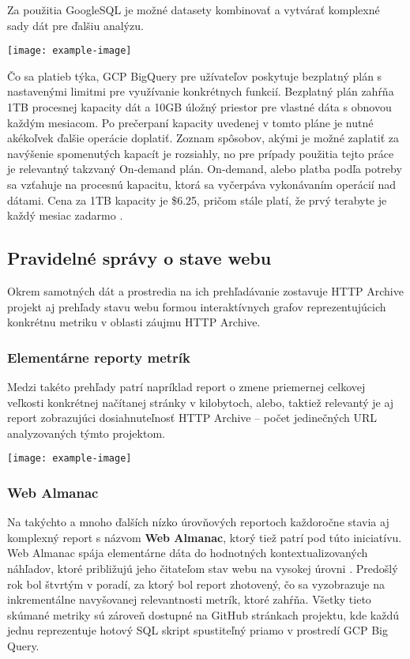 Za použitia GoogleSQL je možné datasety kombinovať a vytvárať komplexné sady dát pre ďalšiu analýzu.

\begin{center}
\noindent\texttt{[image: example-image]}    
\end{center}

Čo sa platieb týka, GCP BigQuery pre užívateľov poskytuje bezplatný plán s nastavenými limitmi pre využívanie konkrétnych funkcií.
Bezplatný plán zahŕňa 1TB procesnej kapacity dát a 10GB úložný priestor pre vlastné dáta s obnovou každým mesiacom.
Po prečerpaní kapacity uvedenej v tomto pláne je nutné akékoľvek ďalšie operácie doplatiť.
Zoznam spôsobov, akými je možné zaplatiť za navýšenie spomenutých kapacít je rozsiahly, no pre prípady použitia tejto práce je relevantný takzvaný On-demand plán.
On-demand, alebo platba podľa potreby sa vzťahuje na procesnú kapacitu, ktorá sa vyčerpáva vykonávaním operácií nad dátami.
Cena za 1TB kapacity je \$6.25, pričom stále platí, že prvý terabyte je každý mesiac zadarmo \cite{google-bq-pricing}.

\subsection{Pravidelné správy o stave webu}

Okrem samotných dát a prostredia na ich prehľadávanie zostavuje HTTP Archive projekt aj prehľady stavu webu formou interaktívnych grafov reprezentujúcich konkrétnu metriku v oblasti záujmu HTTP Archive.

\subsubsection{Elementárne reporty metrík}
Medzi takéto prehľady patrí napríklad report o zmene priemernej celkovej veľkosti konkrétnej načítanej stránky v kilobytoch, alebo, taktiež relevantý je aj report zobrazujúci dosiahnuteľnosť HTTP Archive -- počet jedinečných URL analyzovaných týmto projektom.

\begin{center}
\noindent\texttt{[image: example-image]}    
\end{center}

\subsubsection{Web Almanac}
Na takýchto a mnoho ďalších nízko úrovňových reportoch každoročne stavia aj komplexný report s názvom \textbf{Web Almanac}, ktorý tiež patrí pod túto iniciatívu.
Web Almanac spája elementárne dáta do hodnotných kontextualizovaných náhľadov, ktoré približujú jeho čitateľom stav webu na vysokej úrovni \cite{httparchive-methodology}.
Predošlý rok bol štvrtým v poradí, za ktorý bol report zhotovený, čo sa vyzobrazuje na inkrementálne navyšovanej relevantnosti metrík, ktoré zahŕňa. 
Všetky tieto skúmané metriky sú zároveň dostupné na GitHub stránkach projektu, kde každú jednu reprezentuje hotový SQL skript spustiteľný priamo v prostredí GCP Big Query.

